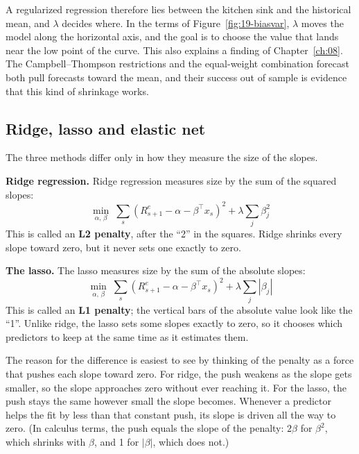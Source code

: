 A regularized regression therefore lies between the kitchen sink and the historical mean, and $\lambda$ decides where. In the terms of Figure~\ref{fig:19-biasvar}, $\lambda$ moves the model along the horizontal axis, and the goal is to choose the value that lands near the low point of the curve. This also explains a finding of Chapter~\ref{ch:08}. The Campbell--Thompson restrictions and the equal-weight combination forecast both pull forecasts toward the mean, and their success out of sample is evidence that this kind of shrinkage works.

\subsection{Ridge, lasso and elastic net}

The three methods differ only in how they measure the size of the slopes.

\textbf{Ridge regression.} Ridge regression measures size by the sum of the squared slopes:
\begin{equation}
  \min_{\alpha,\,\beta} \; \sum_{s} \left(R^{e}_{s+1} - \alpha - \beta^{\top} x_s\right)^2 + \lambda \sum_{j} \beta_j^2
  \label{eq:19-ridge}
\end{equation}
This is called an \textbf{L2 penalty}, after the ``2'' in the squares. Ridge shrinks every slope toward zero, but it never sets one exactly to zero.

\textbf{The lasso.} The lasso measures size by the sum of the absolute slopes:
\begin{equation}
  \min_{\alpha,\,\beta} \; \sum_{s} \left(R^{e}_{s+1} - \alpha - \beta^{\top} x_s\right)^2 + \lambda \sum_{j} |\beta_j|
  \label{eq:19-lasso}
\end{equation}
This is called an \textbf{L1 penalty}; the vertical bars of the absolute value look like the ``1''. Unlike ridge, the lasso sets some slopes exactly to zero, so it chooses which predictors to keep at the same time as it estimates them.

The reason for the difference is easiest to see by thinking of the penalty as a force that pushes each slope toward zero. For ridge, the push weakens as the slope gets smaller, so the slope approaches zero without ever reaching it. For the lasso, the push stays the same however small the slope becomes. Whenever a predictor helps the fit by less than that constant push, its slope is driven all the way to zero. (In calculus terms, the push equals the slope of the penalty: $2\beta$ for $\beta^2$, which shrinks with $\beta$, and 1 for $|\beta|$, which does not.)

